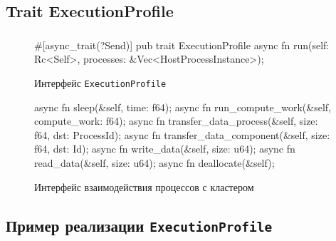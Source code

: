 \documentclass[t]{beamer}  %
\begin{document}
\subsection{Trait ExecutionProfile}

	\begin{frame}[fragile]
		\frametitle{\insertsection} 
		\framesubtitle{\insertsubsection}
		
\begin{figure}[H]
	\centering
	\hspace*{-0.5cm}
	\begin{minipage}{1.15\linewidth}
    \scriptsize
\begin{rustcode}
#[async_trait(?Send)]
pub trait ExecutionProfile {
  async fn run(self: Rc<Self>, processes: &Vec<HostProcessInstance>);
}
\end{rustcode}
	\end{minipage}
\caption*{Интерфейс \texttt{ExecutionProfile}}
\end{figure}

\vspace{-1cm}

\begin{figure}[H]
	\centering
	\hspace*{-0.6cm}
	\begin{minipage}{1.15\linewidth}
    \scriptsize
\begin{rustcode}
async fn sleep(&self, time: f64);
async fn run_compute_work(&self, compute_work: f64);
async fn transfer_data_process(&self, size: f64, dst: ProcessId);
async fn transfer_data_component(&self, size: f64, dst: Id);
async fn write_data(&self, size: u64);
async fn read_data(&self, size: u64);
async fn deallocate(&self);
\end{rustcode}
\end{minipage}
\caption*{Интерфейс взаимодействия процессов с кластером}
\end{figure}



	\end{frame}


	\subsection{Пример реализации \texttt{ExecutionProfile}}
\end{document}
